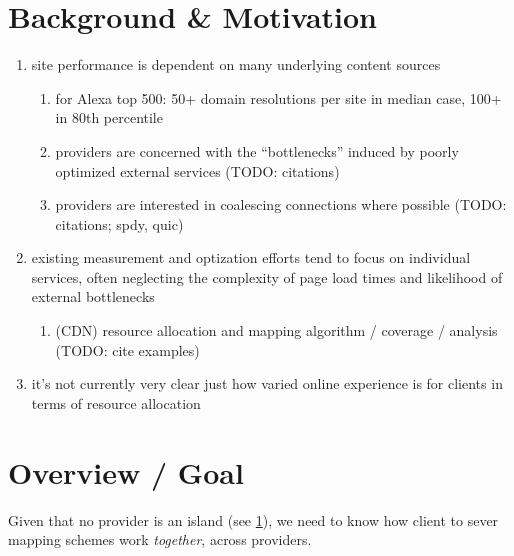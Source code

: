 \documentclass[10pt, sigconf]{acmart}
\begin{document}



\maketitle

\section{Background \& Motivation} \label{sect:background}
\begin{enumerate}
    \item site performance is dependent on many underlying content sources
        \begin{enumerate}
            \item for Alexa top 500: 50+ domain resolutions per site in median case, 100+ in 80th
                percentile \cite{dnssly}
            \item providers are concerned with the ``bottlenecks'' induced by
                poorly optimized external services (TODO: citations)
            \item providers are interested in coalescing connections where
                possible \cite{howspdy} (TODO: citations; spdy, quic)
        \end{enumerate}
    \item existing measurement and optization efforts tend to focus on
        individual services, often neglecting the complexity of page load times
        and likelihood of external bottlenecks
        \begin{enumerate}
            \item (CDN) resource allocation and mapping algorithm / coverage / analysis (TODO: cite
                examples) \cite{akmapping, gmapping, cartography}
        \end{enumerate}
    \item it's not currently very clear just how varied online experience is for
        clients in terms of resource allocation
\end{enumerate}

\section{Overview / Goal}
Given that no provider is an island (see \ref{sect:background}), we need to know
how client to sever mapping schemes work \emph{together}, across providers.
\end{document}
